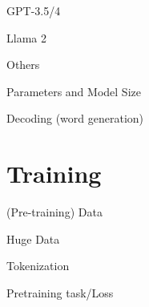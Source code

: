 \documentclass[10pt]{beamer}
\begin{document}
\begin{frame}{GPT-3.5/4}


\end{frame}

\begin{frame}{Llama 2}


\end{frame}


\begin{frame}{Others}


\end{frame}


\begin{frame}{Parameters and Model Size}




\end{frame}


\begin{frame}{Decoding (word generation)}



\end{frame}



\section{Training}

\begin{frame}{(Pre-training) Data}


\end{frame}

\begin{frame}{Huge Data}


\end{frame}

\begin{frame}{Tokenization}


\end{frame}

\begin{frame}{Pretraining task/Loss}


\end{frame}
\end{document}
